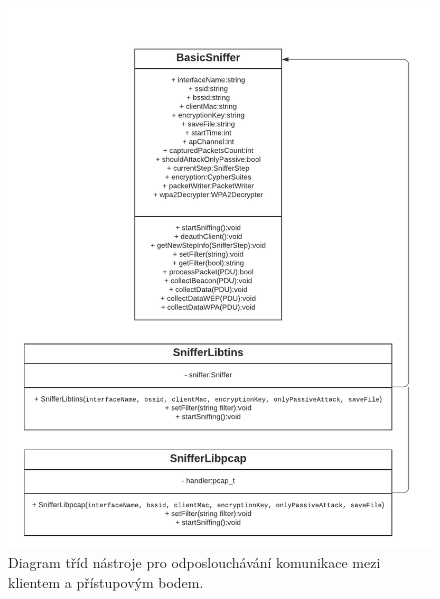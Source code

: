 \begin{figure}[htbp]
  \centering
  \includegraphics[width=14.7cm]{obrazky-figures/Sniffer.pdf}
  \caption{Diagram tříd nástroje pro odposlouchávání komunikace mezi klientem a přístupovým bodem.}
  \label{img:sniffer-classes}
\end{figure}


